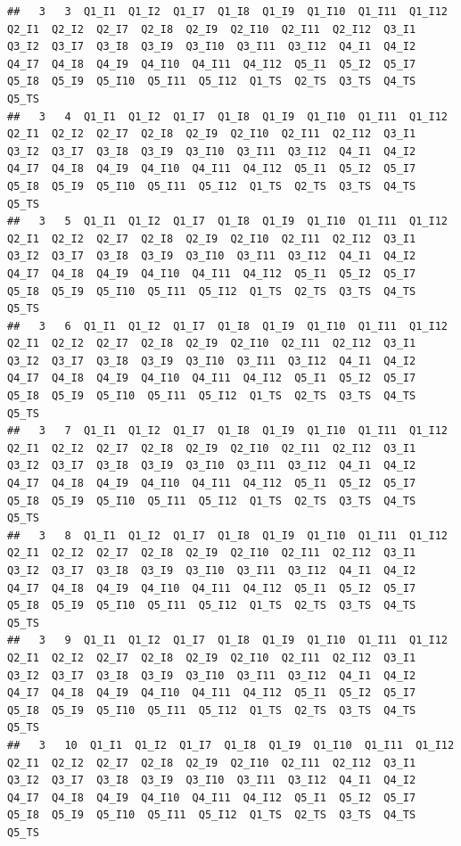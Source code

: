 \documentclass[
]{book}
\begin{document}
\begin{verbatim}
##   3   3  Q1_I1  Q1_I2  Q1_I7  Q1_I8  Q1_I9  Q1_I10  Q1_I11  Q1_I12  Q2_I1  Q2_I2  Q2_I7  Q2_I8  Q2_I9  Q2_I10  Q2_I11  Q2_I12  Q3_I1  Q3_I2  Q3_I7  Q3_I8  Q3_I9  Q3_I10  Q3_I11  Q3_I12  Q4_I1  Q4_I2  Q4_I7  Q4_I8  Q4_I9  Q4_I10  Q4_I11  Q4_I12  Q5_I1  Q5_I2  Q5_I7  Q5_I8  Q5_I9  Q5_I10  Q5_I11  Q5_I12  Q1_TS  Q2_TS  Q3_TS  Q4_TS  Q5_TS
##   3   4  Q1_I1  Q1_I2  Q1_I7  Q1_I8  Q1_I9  Q1_I10  Q1_I11  Q1_I12  Q2_I1  Q2_I2  Q2_I7  Q2_I8  Q2_I9  Q2_I10  Q2_I11  Q2_I12  Q3_I1  Q3_I2  Q3_I7  Q3_I8  Q3_I9  Q3_I10  Q3_I11  Q3_I12  Q4_I1  Q4_I2  Q4_I7  Q4_I8  Q4_I9  Q4_I10  Q4_I11  Q4_I12  Q5_I1  Q5_I2  Q5_I7  Q5_I8  Q5_I9  Q5_I10  Q5_I11  Q5_I12  Q1_TS  Q2_TS  Q3_TS  Q4_TS  Q5_TS
##   3   5  Q1_I1  Q1_I2  Q1_I7  Q1_I8  Q1_I9  Q1_I10  Q1_I11  Q1_I12  Q2_I1  Q2_I2  Q2_I7  Q2_I8  Q2_I9  Q2_I10  Q2_I11  Q2_I12  Q3_I1  Q3_I2  Q3_I7  Q3_I8  Q3_I9  Q3_I10  Q3_I11  Q3_I12  Q4_I1  Q4_I2  Q4_I7  Q4_I8  Q4_I9  Q4_I10  Q4_I11  Q4_I12  Q5_I1  Q5_I2  Q5_I7  Q5_I8  Q5_I9  Q5_I10  Q5_I11  Q5_I12  Q1_TS  Q2_TS  Q3_TS  Q4_TS  Q5_TS
##   3   6  Q1_I1  Q1_I2  Q1_I7  Q1_I8  Q1_I9  Q1_I10  Q1_I11  Q1_I12  Q2_I1  Q2_I2  Q2_I7  Q2_I8  Q2_I9  Q2_I10  Q2_I11  Q2_I12  Q3_I1  Q3_I2  Q3_I7  Q3_I8  Q3_I9  Q3_I10  Q3_I11  Q3_I12  Q4_I1  Q4_I2  Q4_I7  Q4_I8  Q4_I9  Q4_I10  Q4_I11  Q4_I12  Q5_I1  Q5_I2  Q5_I7  Q5_I8  Q5_I9  Q5_I10  Q5_I11  Q5_I12  Q1_TS  Q2_TS  Q3_TS  Q4_TS  Q5_TS
##   3   7  Q1_I1  Q1_I2  Q1_I7  Q1_I8  Q1_I9  Q1_I10  Q1_I11  Q1_I12  Q2_I1  Q2_I2  Q2_I7  Q2_I8  Q2_I9  Q2_I10  Q2_I11  Q2_I12  Q3_I1  Q3_I2  Q3_I7  Q3_I8  Q3_I9  Q3_I10  Q3_I11  Q3_I12  Q4_I1  Q4_I2  Q4_I7  Q4_I8  Q4_I9  Q4_I10  Q4_I11  Q4_I12  Q5_I1  Q5_I2  Q5_I7  Q5_I8  Q5_I9  Q5_I10  Q5_I11  Q5_I12  Q1_TS  Q2_TS  Q3_TS  Q4_TS  Q5_TS
##   3   8  Q1_I1  Q1_I2  Q1_I7  Q1_I8  Q1_I9  Q1_I10  Q1_I11  Q1_I12  Q2_I1  Q2_I2  Q2_I7  Q2_I8  Q2_I9  Q2_I10  Q2_I11  Q2_I12  Q3_I1  Q3_I2  Q3_I7  Q3_I8  Q3_I9  Q3_I10  Q3_I11  Q3_I12  Q4_I1  Q4_I2  Q4_I7  Q4_I8  Q4_I9  Q4_I10  Q4_I11  Q4_I12  Q5_I1  Q5_I2  Q5_I7  Q5_I8  Q5_I9  Q5_I10  Q5_I11  Q5_I12  Q1_TS  Q2_TS  Q3_TS  Q4_TS  Q5_TS
##   3   9  Q1_I1  Q1_I2  Q1_I7  Q1_I8  Q1_I9  Q1_I10  Q1_I11  Q1_I12  Q2_I1  Q2_I2  Q2_I7  Q2_I8  Q2_I9  Q2_I10  Q2_I11  Q2_I12  Q3_I1  Q3_I2  Q3_I7  Q3_I8  Q3_I9  Q3_I10  Q3_I11  Q3_I12  Q4_I1  Q4_I2  Q4_I7  Q4_I8  Q4_I9  Q4_I10  Q4_I11  Q4_I12  Q5_I1  Q5_I2  Q5_I7  Q5_I8  Q5_I9  Q5_I10  Q5_I11  Q5_I12  Q1_TS  Q2_TS  Q3_TS  Q4_TS  Q5_TS
##   3   10  Q1_I1  Q1_I2  Q1_I7  Q1_I8  Q1_I9  Q1_I10  Q1_I11  Q1_I12  Q2_I1  Q2_I2  Q2_I7  Q2_I8  Q2_I9  Q2_I10  Q2_I11  Q2_I12  Q3_I1  Q3_I2  Q3_I7  Q3_I8  Q3_I9  Q3_I10  Q3_I11  Q3_I12  Q4_I1  Q4_I2  Q4_I7  Q4_I8  Q4_I9  Q4_I10  Q4_I11  Q4_I12  Q5_I1  Q5_I2  Q5_I7  Q5_I8  Q5_I9  Q5_I10  Q5_I11  Q5_I12  Q1_TS  Q2_TS  Q3_TS  Q4_TS  Q5_TS

\end{verbatim}
\end{document}
